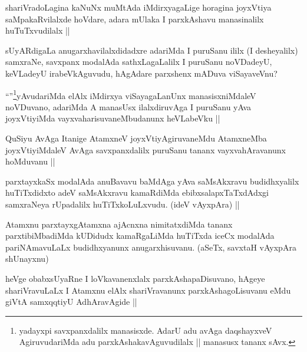 \begin{artha}
shariVradoLagina kaNuNx muMtAda iMdirxyagaLige horagina  joyxVtiya saMpakaRvilalxde hoVdare, adara mUlaka I parxkAshavu manasinalilx huTuTxvudilalx ||
\end{artha}

\begin{artha}
sUyARdigaLa anugarxhavilalxdidadxre adariMda I puruSanu ililx (I desheyalilx) samxraNe, savxpanx modalAda sathxLagaLalilx I puruSanu noVDadeyU, keVLadeyU irabeVkAguvudu, hAgAdare parxshenx mADuva viSayaveVnu?
\end{artha}

\begin{artha}
``\stext''\footnote[1]{yadayxpi savxpanxdalilx manasisxde. AdarU adu avAga daqshayxveV AgiruvudariMda adu parxkAshakavAguvudilalx || manasusx tananx sAvx.}yAvudariMda elAlx iMdirxya viSayagaLanUnx manasisxniMdaleV noVDuvano, adariMda A manasUsx ilalxdiruvAga I puruSanu yAva joyxVtiyiMda vayxvaharisuvaneMbudanunx heVLabeVku ||
\end{artha}

\begin{artha}
  QuSiyu AvAga Itanige AtamxneV joyxVtiyAgiruvaneMdu AtamxneMba joyxVtiyiMdaleV AvAga savxpanxdalilx puruSanu tananx vayxvahAravanunx hoMduvanu ||
\end{artha}

\begin{artha}
parxtayxkaSx modalAda anuBavavu baMdAga yAva saMsAkxravu budidhxyalilx huTiTxdidxto adeV saMsAkxravu kamaRdiMda ebibxsalapxTaTxdAdxgi samxraNeya rUpadalilx huTiTxkoLuLxvudu. (ideV vAyxpAra) ||
\end{artha}

\begin{artha}
Atamxnu parxtayxgAtamxna ajAcnxna nimitatxdiMda tananx parxtibiMbadiMda kUDidudx kamaRgaLiMda huTiTxda iceCx modalAda pariNAmavuLaLx budidhxyanunx anugarxhisuvanu. (aSeTx, savxtaH vAyxpAra shUnayxnu)
\end{artha}

\begin{artha}
heVge obabxsUyaRne I loVkavanenxlalx parxkAshapaDisuvano, hAgeye shariVravuLaLx I Atamxnu elAlx shariVravanunx parxkAshagoLisuvanu eMdu giVtA samxqqtiyU AdhAravAgide ||
\end{artha}

